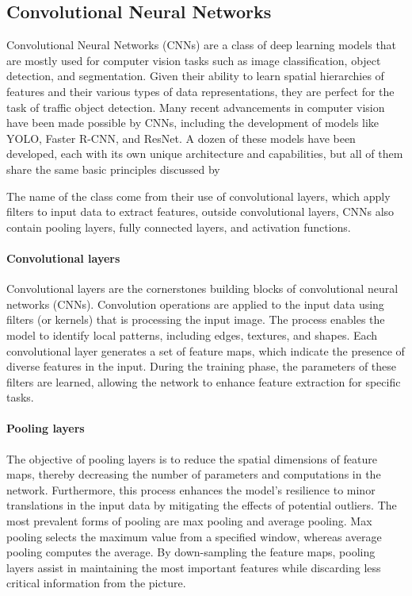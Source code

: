 
\subsection{Convolutional Neural Networks}\label{subsec:convolutional-neural-networks}

Convolutional Neural Networks (CNNs) are a class of deep learning models that are mostly used for computer vision tasks
such as image classification, object detection, and segmentation.
Given their ability to learn spatial hierarchies of features and their various types of data representations,
they are perfect for the task of traffic object detection.
Many recent advancements in computer vision have been made possible by CNNs, including the development of models like YOLO, Faster R-CNN, and ResNet.
A dozen of these models have been developed, each with its own unique architecture and capabilities, 
but all of them share the same basic principles discussed by~\cite{GU2018354}

The name of the class come from their use of convolutional layers, which apply filters to input data to extract features, outside
convolutional layers, CNNs also contain pooling layers, fully connected layers, and activation functions.

\paragraph{Convolutional layers}\label{par:convolutional-layers}

Convolutional layers are the cornerstones building blocks of convolutional neural networks (CNNs).
Convolution operations are applied to the input data using filters (or kernels) that is processing the input image.
The process enables the model to identify local patterns, including edges, textures, and shapes.
Each convolutional layer generates a set of feature maps, which indicate the presence of diverse features in the input.
During the training phase, the parameters of these filters are learned,
allowing the network to enhance feature extraction for specific tasks.

\paragraph{Pooling layers}\label{par:pooling-layers}

The objective of pooling layers is to reduce the spatial dimensions of feature maps,
thereby decreasing the number of parameters and computations in the network.
Furthermore, this process enhances the model's resilience to minor
translations in the input data by mitigating the effects of potential outliers.
The most prevalent forms of pooling are max pooling and average pooling.
Max pooling selects the maximum value from a specified window, whereas average pooling computes the average.
By down-sampling the feature maps, pooling layers assist in maintaining the most important features while discarding less
critical information from the picture.

